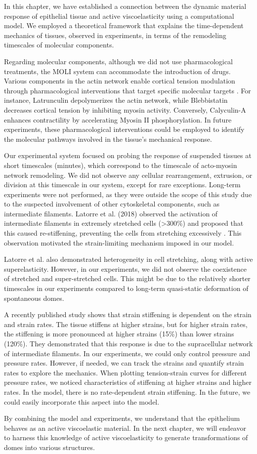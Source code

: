 In this chapter, we have established a connection between the dynamic material response of epithelial tissue and active viscoelasticity using a computational model. We employed a theoretical framework that explains the time-dependent mechanics of tissues, observed in experiments, in terms of the remodeling timescales of molecular components.

Regarding molecular components, although we did not use pharmacological treatments, the MOLI system can accommodate the introduction of drugs. Various components in the actin network enable cortical tension modulation through pharmacological interventions that target specific molecular targets \cite{cartagena-rivera2016}. For instance, Latrunculin depolymerizes the actin network, while Blebbistatin decreases cortical tension by inhibiting myosin activity. Conversely, Calyculin-A enhances contractility by accelerating Myosin II phosphorylation. In future experiments, these pharmacological interventions could be employed to identify the molecular pathways involved in the tissue's mechanical response.

Our experimental system focused on probing the response of suspended tissues at short timescales (minutes), which correspond to the timescale of acto-myosin network remodeling. We did not observe any cellular rearrangement, extrusion, or division at this timescale in our system, except for rare exceptions. Long-term experiments were not performed, as they were outside the scope of this study due to the suspected involvement of other cytoskeletal components, such as intermediate filaments. Latorre et al. (2018) observed the activation of intermediate filaments in extremely stretched cells (>300\%) and proposed that this caused re-stiffening, preventing the cells from stretching excessively \cite{latorre2018}. This observation motivated the strain-limiting mechanism imposed in our model.

Latorre et al. also demonstrated heterogeneity in cell stretching, along with active superelasticity. However, in our experiments, we did not observe the coexistence of stretched and super-stretched cells. This might be due to the relatively shorter timescales in our experiments compared to long-term quasi-static deformation of spontaneous domes.

A recently published study \cite{duque2023} shows that strain stiffening is dependent on the strain and strain rates. The tissue stiffens at higher strains, but for higher strain rates, the stiffening is more pronounced at higher strains (15\%) than lower strains (120\%). They demonstrated that this response is due to the supracellular network of intermediate filaments. In our experiments, we could only control pressure and pressure rates. However, if needed, we can track the strains and quantify strain rates to explore the mechanics. When plotting tension-strain curves for different pressure rates, we noticed characteristics of stiffening at higher strains and higher rates. In the model, there is no rate-dependent strain stiffening. In the future, we could easily incorporate this aspect into the model.

By combining the model and experiments, we understand that the epithelium behaves as an active viscoelastic material. In the next chapter, we will endeavor to harness this knowledge of active viscoelasticity to generate transformations of domes into various structures.
